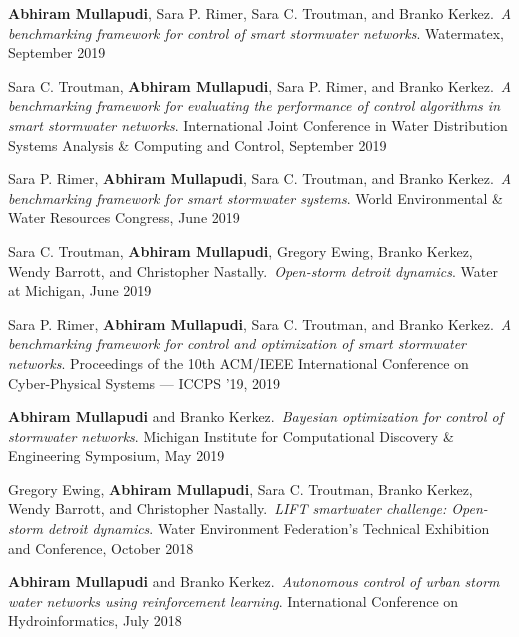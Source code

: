 \documentclass[a4paper,11pt]{article}
\newcommand{\years}[1]{%
  {\reversemarginpar\strut\marginnote{{\small#1}}}%
}
\begin{document}
\years{2019} \textbf{Abhiram Mullapudi}, Sara P. Rimer, Sara C. Troutman, and Branko Kerkez.\ \emph{A benchmarking framework for control of smart stormwater networks}. Watermatex, September 2019\\[.1cm]

\years{2019} Sara C. Troutman, \textbf{Abhiram Mullapudi}, Sara P. Rimer, and Branko Kerkez.\ \emph{A benchmarking framework for evaluating the performance of control algorithms in smart stormwater networks}. International Joint Conference in Water Distribution Systems Analysis \& Computing and Control, September 2019\\[.1cm]

\years{2019} Sara P. Rimer, \textbf{Abhiram Mullapudi}, Sara C. Troutman, and Branko Kerkez.\ \emph{A benchmarking framework for smart stormwater systems}. World Environmental \& Water Resources Congress, June 2019\\[.1cm]

\years{2019} Sara C. Troutman, \textbf{Abhiram Mullapudi}, Gregory Ewing, Branko Kerkez, Wendy Barrott, and Christopher Nastally.\ \emph{Open-storm detroit dynamics}. Water at Michigan, June 2019\\[.1cm]

\years{2019} Sara P. Rimer, \textbf{Abhiram Mullapudi}, Sara C. Troutman, and Branko Kerkez.\ \emph{A benchmarking framework for control and optimization of smart stormwater networks}. Proceedings of the 10th ACM/IEEE International Conference on Cyber-Physical Systems --- ICCPS ’19, 2019\\[.1cm]

\years{2019} \textbf{Abhiram Mullapudi} and Branko Kerkez.\ \emph{Bayesian optimization for control of stormwater networks}. Michigan Institute for Computational Discovery \& Engineering Symposium, May 2019\\[.1cm]

\years{2018} Gregory Ewing, \textbf{Abhiram Mullapudi}, Sara C. Troutman, Branko Kerkez, Wendy Barrott, and Christopher Nastally.\ \emph{LIFT smartwater challenge: Open-storm detroit dynamics}. Water Environment Federation's Technical Exhibition and Conference, October 2018\\[.1cm]

\years{2018} \textbf{Abhiram Mullapudi} and Branko Kerkez.\ \emph{Autonomous control of urban storm water networks using reinforcement learning}. International Conference on Hydroinformatics, July 2018\\[.1cm]
\end{document}
